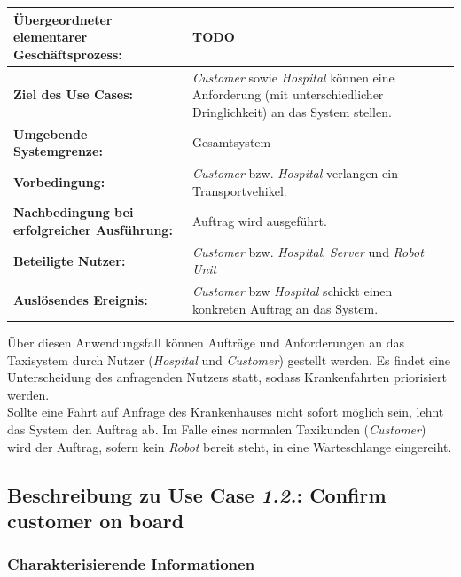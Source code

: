 			\begin{table}[H]
				\centering
				\begin{tabularx}{\textwidth}{|p{5cm}|X|}
					\hline
					\textbf{Übergeordneter elementarer Geschäftsprozess:} & TODO  \\ \hline
					\textbf{Ziel des Use Cases:} & \emph{Customer} sowie \emph{Hospital} können eine Anforderung (mit unterschiedlicher Dringlichkeit) an das System stellen. \\ \hline
					\textbf{Umgebende Systemgrenze:} & Gesamtsystem \\ \hline
					\textbf{Vorbedingung:} & \emph{Customer} bzw. \emph{Hospital} verlangen ein Transportvehikel. \\ \hline
					\textbf{Nachbedingung bei erfolgreicher Ausführung:} & Auftrag wird ausgeführt. \\ \hline
					\textbf{Beteiligte Nutzer:} & \emph{Customer} bzw. \emph{Hospital}, \emph{Server} und \emph{Robot Unit} \\ \hline
					\textbf{Auslösendes Ereignis:} & \emph{Customer} bzw \emph{Hospital} schickt einen konkreten Auftrag an das System. \\
					\hline
				\end{tabularx}
			\end{table}
			
			Über diesen Anwendungsfall können Aufträge und Anforderungen an das Taxisystem durch Nutzer (\emph{Hospital} und \emph{Customer}) gestellt werden.
			Es findet eine Unterscheidung des anfragenden Nutzers statt, sodass Krankenfahrten priorisiert werden. \\ Sollte eine Fahrt auf Anfrage des Krankenhauses nicht sofort möglich sein, lehnt das System den Auftrag ab. Im Falle eines normalen Taxikunden (\emph{Customer}) wird der Auftrag, sofern kein \emph{Robot} bereit steht, in eine Warteschlange eingereiht.
			
			
			\pagebreak
	
			\subsection*{Beschreibung zu Use Case \emph{1.2.}: Confirm customer on board}
				\subsubsection*{Charakterisierende Informationen}
				
